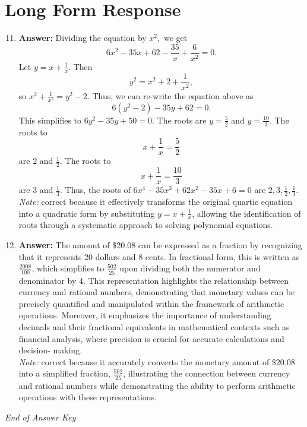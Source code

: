 \documentclass[12pt]{article}
\begin{document}
\section*{Long Form Response}
\begin{enumerate}[label=\arabic*.]
\setcounter{enumi}{10}
\item \textbf{Answer:} Dividing the equation by $x^2,$ we get \[6 x^2 - 35 x + 62 - \frac{35}{x} + \frac{6}{x^2} = 0.\]Let $y = x + \frac{1}{x}.$ Then \[y^2 = x^2 + 2 + \frac{1}{x^2},\]so $x^2 + \frac{1}{x^2} = y^2 - 2.$ Thus, we can re-write the equation above as \[6(y^2 - 2) - 35 y + 62 = 0.\]This simplifies to $6 y^2 - 35 y + 50 = 0.$ The roots are $y = \frac{5}{2}$ and $y = \frac{10}{3}.$ The roots to \[x + \frac{1}{x} = \frac{5}{2}\]are 2 and $\frac{1}{2}.$ The roots to \[x + \frac{1}{x} = \frac{10}{3}\]are 3 and $\frac{1}{3}.$ Thus, the roots of $6 x^4 - 35 x^3 + 62 x^2 - 35 x + 6 = 0$ are $\boxed{2, 3, \frac{1}{2}, \frac{1}{3}}.$
\\ \textit{Note:} correct because it effectively transforms the original quartic equation into a quadratic form by substituting \( y = x + \frac{1}{x} \), allowing the identification of roots through a systematic approach to solving polynomial equations.
\item \textbf{Answer:} The amount of \$20.08 can be expressed as a fraction by recognizing that it represents 20 dollars and 8 cents. In fractional form, this is written as \( \frac{2008}{100} \), which simplifies to \( \frac{502}{25} \) upon dividing both the numerator and denominator by 4. This representation highlights the relationship between currency and rational numbers, demonstrating that monetary values can be precisely quantified and manipulated within the framework of arithmetic operations. Moreover, it emphasizes the importance of understanding decimals and their fractional equivalents in mathematical contexts such as financial analysis, where precision is crucial for accurate calculations and decision- making.
\\ \textit{Note:} correct because it accurately converts the monetary amount of \$20.08 into a simplified fraction, \( \frac{502}{25} \), illustrating the connection between currency and rational numbers while demonstrating the ability to perform arithmetic operations with these representations.
\end{enumerate}

\vfill
\noindent\textit{End of Answer Key}
\end{document}
